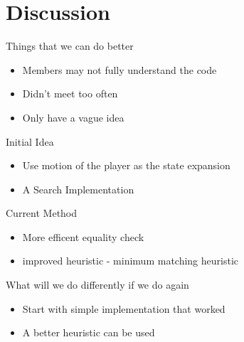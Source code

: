\documentclass{beamer}
\begin{document}
\section{Discussion}
\begin{frame}
Things that we can do better
  \begin{itemize}
  \item Members may not fully understand the code
  \item Didn't meet too often
  \item Only have a vague idea
 
  \end{itemize}
\end{frame}

\begin{frame}
Initial Idea
  \begin{itemize}
  \item Use motion of the player as the state expansion
  \item A\* Search Implementation
  \end{itemize}
\end{frame}

\begin{frame}
Current Method
  \begin{itemize}
  \item More efficent equality check
  \item improved heuristic - minimum matching heuristic
  \end{itemize}
\end{frame}

\begin{frame}
What will we  do differently if we do again
  \begin{itemize}
  \item Start with simple implementation that worked
  \item A better heuristic can be used
  \end{itemize}
\end{frame}
\end{document}
